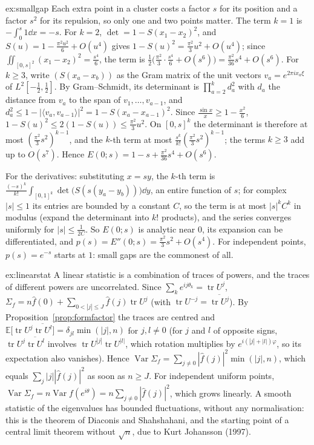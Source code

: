 \begin{solution}{ex:smallgap}
\idea Each extra point in a cluster costs a factor $s$ for its position and a factor $s^2$ for its repulsion, so only one and two points matter.
\writeup The term $k=1$ is $-\int_0^s1\dd x=-s$. For $k=2$, $\det=1-S(x_1-x_2)^2$, and $S(u)=1-\frac{\pi^2u^2}6+O(u^4)$ gives $1-S(u)^2=\frac{\pi^2}3u^2+O(u^4)$; since $\iint_{[0,s]^2}(x_1-x_2)^2=\frac{s^4}6$, the term is
$\frac12\bigl(\frac{\pi^2}3\cdot\frac{s^4}6+O(s^6)\bigr)=\frac{\pi^2}{36}s^4+O(s^6)$. For $k\ge3$, write $(S(x_a-x_b))$ as the Gram matrix of the unit vectors $v_a=e^{2\pi ix_a\xi}$ of $L^2[-\frac12,\frac12]$. By Gram--Schmidt, its determinant is $\prod_{a=2}^kd_a^2$ with $d_a$ the
distance from $v_a$ to the span of $v_1,\dots,v_{a-1}$, and $d_a^2\le1-|\langle v_a,v_{a-1}\rangle|^2=1-S(x_a-x_{a-1})^2$. Since $\frac{\sin x}x\ge1-\frac{x^2}6$, $1-S(u)^2\le2(1-S(u))\le\frac{\pi^2}3u^2$. On $[0,s]^k$ the determinant is therefore at most
$(\frac{\pi^2}3s^2)^{k-1}$, and the $k$-th term at most $\frac{s^k}{k!}(\frac{\pi^2}3s^2)^{k-1}$; the terms $k\ge3$ add up to $O(s^7)$. Hence $E(0;s)=1-s+\frac{\pi^2}{36}s^4+O(s^6)$.

For the derivatives: substituting $x=sy$, the $k$-th term is $\frac{(-s)^k}{k!}\int_{[0,1]^k}\det\bigl(S(s(y_a-y_b))\bigr)\dd y$, an entire function of $s$; for complex $|s|\le1$ its entries are bounded by a constant $C$, so the term is at most $|s|^kC^k$ in modulus (expand the
determinant into $k!$ products), and the series converges uniformly for $|s|\le\frac1{2C}$. So $E(0;s)$ is analytic near $0$, its expansion can be differentiated, and $p(s)=E''(0;s)=\frac{\pi^2}3s^2+O(s^4)$. For independent points, $p(s)=e^{-s}$ starts at $1$: small gaps are the commonest of all.
\end{solution}

\begin{solution}{ex:linearstat}
\idea A linear statistic is a combination of traces of powers, and the traces of different powers are uncorrelated.
\writeup Since $\sum_ke^{ij\theta_k}=\operatorname{tr}U^j$, $\Sigma_f=n\hat f(0)+\sum_{0<|j|\le J}\hat f(j)\operatorname{tr}U^j$ (with $\operatorname{tr}U^{-j}=\overline{\operatorname{tr}U^j}$). By Proposition~\ref{prop:formfactor} the traces are centred and
$\mathbb E\bigl[\operatorname{tr}U^j\overline{\operatorname{tr}U^l}\bigr]=\delta_{jl}\min(|j|,n)$ for $j,l\ne0$ (for $j$ and $l$ of opposite signs, $\operatorname{tr}U^j\overline{\operatorname{tr}U^l}$ involves $\operatorname{tr}U^{|j|}\operatorname{tr}U^{|l|}$, which rotation multiplies by
$e^{i(|j|+|l|)\varphi}$, so its expectation also vanishes). Hence $\operatorname{Var}\Sigma_f=\sum_{j\ne0}|\hat f(j)|^2\min(|j|,n)$, which equals $\sum_j|j||\hat f(j)|^2$ as soon as $n\ge J$. For independent uniform points, $\operatorname{Var}\Sigma_f=n\operatorname{Var}f(e^{i\theta})=n\sum_{j\ne0}|\hat f(j)|^2$,
which grows linearly. A smooth statistic of the eigenvalues has bounded fluctuations, without any normalisation: this is the theorem of Diaconis and Shahshahani, and the starting point of a central limit theorem without
$\sqrt n$, due to Kurt Johansson (1997).
\end{solution}

